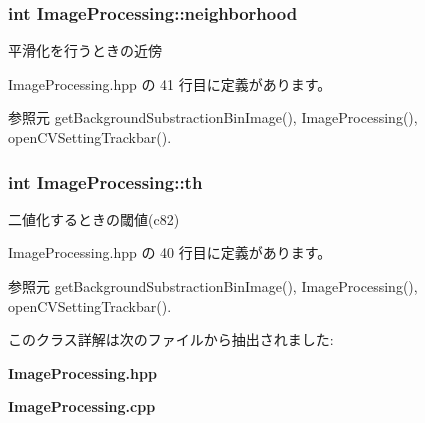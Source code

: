 \subsubsection[{neighborhood}]{\setlength{\rightskip}{0pt plus 5cm}int Image\-Processing\-::neighborhood}\label{class_image_processing_a4047a0099a07190f555c5c99d311ee42}


平滑化を行うときの近傍 



 Image\-Processing.\-hpp の 41 行目に定義があります。



参照元 get\-Background\-Substraction\-Bin\-Image(), Image\-Processing(), open\-C\-V\-Setting\-Trackbar().

\subsubsection[{th}]{\setlength{\rightskip}{0pt plus 5cm}int Image\-Processing\-::th}\label{class_image_processing_a3b07a07726eed8b5e1da00017713068d}


二値化するときの閾値(c82) 



 Image\-Processing.\-hpp の 40 行目に定義があります。



参照元 get\-Background\-Substraction\-Bin\-Image(), Image\-Processing(), open\-C\-V\-Setting\-Trackbar().



このクラス詳解は次のファイルから抽出されました\-:\begin{DoxyCompactItemize}
\item 
{\bf Image\-Processing.\-hpp}\item 
{\bf Image\-Processing.\-cpp}\end{DoxyCompactItemize}
